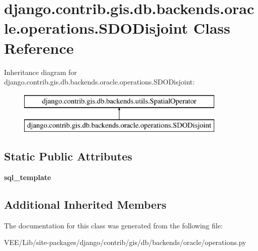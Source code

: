 \hypertarget{classdjango_1_1contrib_1_1gis_1_1db_1_1backends_1_1oracle_1_1operations_1_1_s_d_o_disjoint}{}\section{django.\+contrib.\+gis.\+db.\+backends.\+oracle.\+operations.\+S\+D\+O\+Disjoint Class Reference}
\label{classdjango_1_1contrib_1_1gis_1_1db_1_1backends_1_1oracle_1_1operations_1_1_s_d_o_disjoint}
Inheritance diagram for django.\+contrib.\+gis.\+db.\+backends.\+oracle.\+operations.\+S\+D\+O\+Disjoint\+:\begin{figure}[H]
\begin{center}
\leavevmode
\includegraphics[height=2.000000cm]{classdjango_1_1contrib_1_1gis_1_1db_1_1backends_1_1oracle_1_1operations_1_1_s_d_o_disjoint}
\end{center}
\end{figure}
\subsection*{Static Public Attributes}
\begin{DoxyCompactItemize}
\item 
\mbox{\label{classdjango_1_1contrib_1_1gis_1_1db_1_1backends_1_1oracle_1_1operations_1_1_s_d_o_disjoint_a638f2e4d61edf4e5b7f555247eed2308}} 
{\bfseries sql\+\_\+template}
\end{DoxyCompactItemize}
\subsection*{Additional Inherited Members}


The documentation for this class was generated from the following file\+:\begin{DoxyCompactItemize}
\item 
V\+E\+E/\+Lib/site-\/packages/django/contrib/gis/db/backends/oracle/operations.\+py\end{DoxyCompactItemize}
